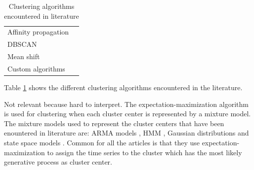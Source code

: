 \begin{table}[h]
\begin{tabular}{p{}p{}}
        Affinity propagation  				                                & \cite{auto_encoder_many_tsc_algorithms} \\
        DBSCAN  							                                & \cite{auto_encoder_many_tsc_algorithms} \\
        Mean shift  						                                & \cite{auto_encoder_many_tsc_algorithms} \\
        Custom algorithms 					                                & \cite{clust_large_datasets_aghabozorg, multivariate_tsc_common_pca, tensor_multi_elastic_kernel_tsc, var_multivar_tsc, xml_dft_delaunay_traingulation} \\
        \bottomrule
    \end{tabular}
    \caption{Clustering algorithms encountered in literature}
    \label{tab:clust_alg}
\end{table}
Table \ref{tab:clust_alg} shows the different clustering algorithms encountered in the literature. 








Not relevant because hard to interpret.
The expectation-maximization algorithm is used for clustering when each cluster center is represented by a mixture model. 
The mixture models used to represent the cluster centers that have been enountered in literature are: ARMA models \cite{moar_mpl_tsc}, HMM \cite{mixture_gaussian_hmm}, Gaussian distributions \cite{auto_encoder_many_tsc_algorithms} and state space models \cite{hier_clust_w_state_space_models}.
Common for all the articles is that they use expectation-maximization to assign the time series to the cluster which has the most likely generative process as cluster center.

